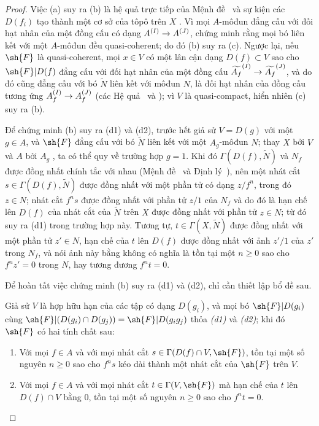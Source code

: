\documentclass[oneside]{amsart}
\makeatletter
\renewcommand{\geq}{\geqslant}
\newcommand{\ega@arrow}[2]{\mathchoice{#1}{#2}{#2}{#2}}
\renewcommand{\to}{\ega@arrow{\longrightarrow}{\rightarrow}}
\newcommand{\oldpage}[2][]{{\marginnote{\normalfont\textbf{#1}~|~#2}}\ignorespaces}
\let\EGAOriginalLabel\label
\renewcommand{\label}[1]{\phantomsection\EGAOriginalLabel{#1}}
\makeatother
\begin{document}
\begin{proof}
Việc (a) suy ra (b) là hệ quả trực tiếp của Mệnh đề~ và sự kiện các $D(f_i)$ tạo thành một cơ sở của tôpô trên $X$ .
Vì mọi $A$-môđun đẳng cấu với đối hạt nhân của một đồng cấu có dạng $A^{(I)}\to A^{(J)}$,  chứng minh rằng mọi bó liên kết với một $A$-môđun đều quasi-coherent;
do đó (b) suy ra (c).
Ngược lại, nếu $\sh{F}$ là quasi-coherent, mọi $x\in V$ có một lân cận dạng $D(f)\subset V$ sao cho $\sh{F}|D(f)$ đẳng cấu với đối hạt nhân của một đồng cấu $\widetilde{A_f}^{(I)}\to\widetilde{A_f}^{(J)}$, và do đó cũng đẳng cấu với bó $\widetilde{N}$ liên kết với môđun $N$, là đối hạt nhân của đồng cấu tương ứng
$A_f^{(I)}\to A_f^{(J)}$ (các Hệ quả~ và );
vì $V$ là quasi-compact, hiển nhiên (c) suy ra (b).

\oldpage[I]{91}
Để chứng minh (b) suy ra (d1) và (d2), trước hết giả sử $V=D(g)$ với một $g\in A$, và $\sh{F}$ đẳng cấu với bó $\widetilde{N}$ liên kết với một $A_g$-môđun $N$;
thay $X$ bởi $V$ và $A$ bởi $A_g$ , ta có thể quy về trường hợp $g=1$.
Khi đó $\Gamma(D(f),\widetilde{N})$ và $N_f$ được đồng nhất chính tắc với nhau (Mệnh đề~ và Định lý~), nên một nhát cắt $s\in\Gamma(D(f),\widetilde{N})$ được đồng nhất với một phần tử có dạng $z/f^n$, trong đó $z\in N$;
nhát cắt $f^n s$ được đồng nhất với phần tử $z/1$ của $N_f$ và do đó là hạn chế lên $D(f)$ của nhát cắt của $\widetilde{N}$ trên $X$ được đồng nhất với phần tử $z\in N$;
từ đó suy ra (d1) trong trường hợp này.
Tương tự, $t\in\Gamma(X,\widetilde{N})$ được đồng nhất với một phần tử $z'\in N$, hạn chế của $t$ lên $D(f)$ được đồng nhất với ảnh $z'/1$ của $z'$ trong $N_f$, và nói ảnh này bằng không có nghĩa là tồn tại một $n\geq 0$ sao cho $f^n z'=0$ trong $N$, hay tương đương $f^n t=0$.

Để hoàn tất việc chứng minh (b) suy ra (d1) và (d2), chỉ cần thiết lập bổ đề sau.
\begin{lemma}[1.4.1.1]
\label{I.1.4.1.1}
Giả sử $V$ là hợp hữu hạn của các tập có dạng $D(g_i)$, và mọi bó $\sh{F}|D(g_i)$ cùng $\sh{F}|(D(g_i)\cap D(g_j))=\sh{F}|D(g_i g_j)$ thỏa \emph{(d1)} và \emph{(d2)};
khi đó $\sh{F}$ có hai tính chất sau:
\begin{enumerate}
  \item[{\rm(d'1)}] Với mọi $f\in A$ và với mọi nhát cắt $s\in\Gamma(D(f)\cap V,\sh{F})$, tồn tại một số nguyên $n\geq 0$ sao cho $f^n s$ kéo dài thành một nhát cắt của $\sh{F}$ trên $V$.
  \item[{\rm(d'2)}] Với mọi $f\in A$ và với mọi nhát cắt $t\in\Gamma(V,\sh{F})$ mà hạn chế của $t$ lên $D(f)\cap V$ bằng $0$, tồn tại một số nguyên $n\geq 0$ sao cho $f^n t=0$.
\end{enumerate}
\end{lemma}


\end{proof}
\end{document}
